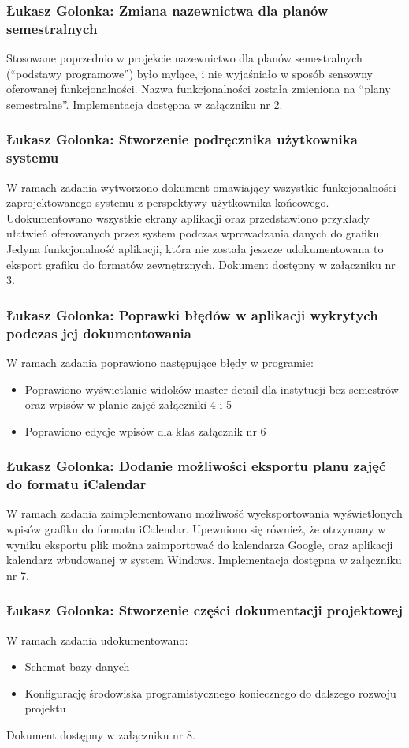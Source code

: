 \documentclass[12pt,a4paper,oneside]{article}
\theoremstyle{definition}
\numberwithin{equation}{section}
\begin{document}
\subsubsection{Łukasz Golonka: Zmiana nazewnictwa dla planów semestralnych}
Stosowane poprzednio w projekcie nazewnictwo dla planów semestralnych (``podstawy programowe'') było mylące, i nie wyjaśniało w sposób sensowny oferowanej funkcjonalności.
Nazwa funkcjonalności została zmieniona na ``plany semestralne''.
Implementacja dostępna w załączniku nr 2.

\subsubsection{Łukasz Golonka: Stworzenie podręcznika użytkownika systemu}
W ramach zadania wytworzono dokument omawiający wszystkie funkcjonalności zaprojektowanego systemu z perspektywy użytkownika końcowego.
Udokumentowano wszystkie ekrany aplikacji oraz przedstawiono przykłady ułatwień oferowanych przez system podczas wprowadzania danych do grafiku.
Jedyna funkcjonalność aplikacji, która nie została jeszcze udokumentowana to eksport grafiku do formatów zewnętrznych.
Dokument dostępny w załączniku nr 3.

\subsubsection{Łukasz Golonka: Poprawki błędów w aplikacji wykrytych podczas jej dokumentowania}
W ramach zadania poprawiono następujące błędy w programie:
\begin{itemize}
\item Poprawiono wyświetlanie widoków master-detail dla instytucji bez semestrów oraz wpisów w planie zajęć załączniki 4 i 5
\item Poprawiono edycje wpisów dla klas załącznik nr 6
\end{itemize}

\subsubsection{Łukasz Golonka: Dodanie możliwości eksportu planu zajęć do formatu iCalendar}
W ramach zadania zaimplementowano możliwość wyeksportowania wyświetlonych wpisów grafiku do formatu iCalendar.
Upewniono się również, że otrzymany w wyniku eksportu plik można zaimportować do kalendarza Google, oraz aplikacji kalendarz wbudowanej w system Windows.
Implementacja dostępna w załączniku nr 7.

\subsubsection{Łukasz Golonka: Stworzenie części dokumentacji projektowej}
W ramach zadania udokumentowano:
\begin{itemize}
\item Schemat bazy danych
\item Konfigurację środowiska programistycznego koniecznego do dalszego rozwoju projektu
\end{itemize}
Dokument dostępny w załączniku nr 8.
\end{document}
